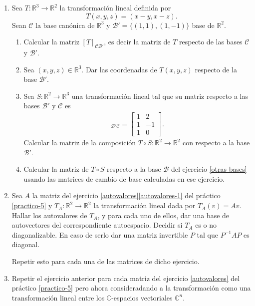 \begin{enumerate}[topsep=6pt, itemsep=.4cm]
\item\label{matriz transformaciones ejemplo} Sea 
$T:\mathbb{R}^3\longrightarrow\mathbb{R}^2$ la transformación lineal definida por $$T(x,y,z)=(x-y,x-z).$$ Sean $\mathcal{C}$ la base canónica de $\mathbb{R}^3$ y $\mathcal{B}'=\{(1,1),(1,-1)\}$ base de $\mathbb{R}^2$.
\begin{enumerate}
    \item\label{matriz transformaciones ejemplo-a} Calcular la matriz $[T]_{\mathcal{C}\mathcal{B}'}$, es decir la matriz de $T$ respecto de las bases $\mathcal{C}$ y $\mathcal{B}'$.
    \item\label{matriz transformaciones ejemplo-b} Sea $(x,y,z)\in\mathbb{R}^3$. Dar las coordenadas de $T(x,y,z)$ respecto de la base $\mathcal{B}'$.
    \item\label{matriz transformaciones ejemplo-c} Sea $S:\mathbb{R}^2\longrightarrow\mathbb{R}^3$ una transformación lineal tal que su matriz respecto a las bases $\mathcal{B}'$ y $\mathcal{C}$ es
    \begin{align*}
    [S]_{\mathcal{B}'\mathcal{C}}=\begin{bmatrix}
    1&2\\1&-1\\1&0
    \end{bmatrix}. 
    \end{align*}
    Calcular la matriz de la composición $T\circ S:\mathbb{R}^2\longrightarrow\mathbb{R}^2$ con respecto a la base $\mathcal{B}'$. 
    \item\label{matriz transformaciones ejemplo-d} Calcular la matriz de $T\circ S$ respecto a la base $\mathcal{B}$ del ejercicio \ref{otras bases} usando las matrices de cambio de base calculadas en ese ejercicio.
\end{enumerate}


\item Sea $A$ la matriz  del ejercicio \ref{autovalores}\ref{autovalores-1} del práctico \ref{practico-5} y $T_A:\mathbb{R}^2\longrightarrow\mathbb{R}^2$ la transformación lineal dada por $T_A(v)=Av$. Hallar los autovalores de $T_A$, y para cada uno de ellos, dar una base de autovectores del correspondiente autoespacio. Decidir si $T_A$ es o no diagonalizable. En caso de serlo dar una matriz invertible $P$ tal que $P^{-1}AP$ es diagonal. 

Repetir esto para cada una de las matrices de dicho ejercicio.


\item Repetir el ejercicio anterior para cada matriz del ejercicio \ref{autovalores} del práctico \ref{practico-5} pero ahora consideradando a la transformación como una transformación lineal entre los $\mathbb{C}$-espacios vectoriales $\mathbb{C}^n$.



\end{enumerate}
